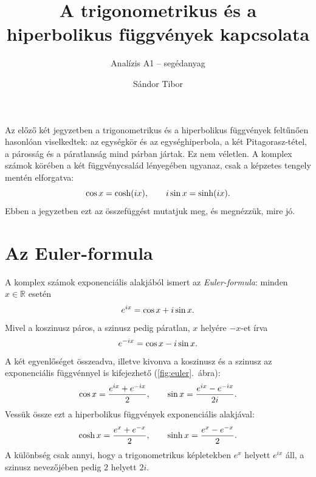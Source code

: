 \documentclass[11pt]{scrartcl}
\title{A trigonometrikus és a hiperbolikus függvények kapcsolata}
\subtitle{Analízis A1 -- segédanyag}
\author{Sándor Tibor}
\date{}
\theoremstyle{definition}
\theoremstyle{remark}
\begin{document}
\maketitle

Az előző két jegyzetben a trigonometrikus és a hiperbolikus függvények
feltűnően hasonlóan viselkedtek: az egységkör és az egységhiperbola, a két
Pitagorasz-tétel, a párosság és a páratlanság mind párban jártak. Ez nem
véletlen. A komplex számok körében a két függvénycsalád lényegében ugyanaz,
csak a képzetes tengely mentén elforgatva:
\[
	\cos x = \cosh(ix), \qquad i \sin x = \sinh(ix)\text.
\]
Ebben a jegyzetben ezt az összefüggést mutatjuk meg, és megnézzük, mire jó.

\section{Az Euler-formula}

A komplex számok exponenciális alakjából ismert az \emph{Euler-formula}:
minden $x \in \mathbb{R}$ esetén
\[
	e^{ix} = \cos x + i \sin x\text.
\]
Mivel a koszinusz páros, a szinusz pedig páratlan, $x$ helyére $-x$-et írva
\[
	e^{-ix} = \cos x - i \sin x\text.
\]
A két egyenlőséget összeadva, illetve kivonva a koszinusz és a szinusz az
exponenciális függvénnyel is kifejezhető (\ref{fig:euler}.~ábra):
\[
	\cos x = \frac{e^{ix} + e^{-ix}}{2}, \qquad
	\sin x = \frac{e^{ix} - e^{-ix}}{2i}\text.
\]
Vessük össze ezt a hiperbolikus függvények exponenciális alakjával:
\[
	\cosh x = \frac{e^{x} + e^{-x}}{2}, \qquad
	\sinh x = \frac{e^{x} - e^{-x}}{2}\text.
\]
A különbség csak annyi, hogy a trigonometrikus képletekben $e^{x}$ helyett
$e^{ix}$ áll, a szinusz nevezőjében pedig $2$ helyett $2i$.
\end{document}

